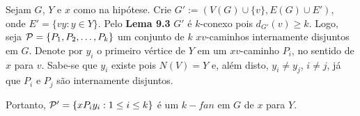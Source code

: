 
Sejam $G$, $Y$ e $x$ como na hipótese. Crie $G' := (V(G) \cup \{v\}, E(G) \cup E')$, onde $E' = \{vy : y \in Y\}$.
Pelo {\bf Lema 9.3} $G'$ é $k$-conexo pois $d_{G'}(v) \ge k$. Logo, seja ${\cal P} = \{ P_1, P_2, \ldots, P_k\}$ um
conjunto de $k$ $xv$-caminhos internamente disjuntos em $G$. Denote por $y_i$ o primeiro vértice de $Y$ em um $xv$-caminho
$P_i$, no sentido de $x$ para $v$. Sabe-se que $y_i$ existe pois $N(V) = Y$ e, além disto, $y_i \ne y_j$, $i\ne j$, já
que $P_i$ e $P_j$ são internamente disjuntos.

Portanto, ${\cal P'} = \{ xP_iy_i : 1 \le i \le k\}$ é um $k-fan$ em $G$ de $x$ para $Y$.
\fimprova

